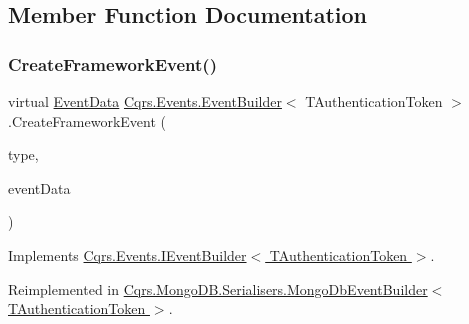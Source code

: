 \subsection{Member Function Documentation}
\mbox{\label{classCqrs_1_1Events_1_1EventBuilder_aa6a794ef27f2795802a4390fd16535f6_aa6a794ef27f2795802a4390fd16535f6}} 
\subsubsection{\texorpdfstring{Create\+Framework\+Event()}{CreateFrameworkEvent()}\hspace{0.1cm}{\footnotesize\ttfamily [1/2]}}
{\footnotesize\ttfamily virtual \hyperlink{classCqrs_1_1Events_1_1EventData}{Event\+Data} \hyperlink{classCqrs_1_1Events_1_1EventBuilder}{Cqrs.\+Events.\+Event\+Builder}$<$ T\+Authentication\+Token $>$.Create\+Framework\+Event (\begin{DoxyParamCaption}\item[{string}]{type,  }\item[{\hyperlink{interfaceCqrs_1_1Events_1_1IEvent}{I\+Event}$<$ T\+Authentication\+Token $>$}]{event\+Data }\end{DoxyParamCaption})\hspace{0.3cm}{\ttfamily [virtual]}}



Implements \hyperlink{interfaceCqrs_1_1Events_1_1IEventBuilder_ac77123302de4e79df9661c13219af4d4_ac77123302de4e79df9661c13219af4d4}{Cqrs.\+Events.\+I\+Event\+Builder$<$ T\+Authentication\+Token $>$}.



Reimplemented in \hyperlink{classCqrs_1_1MongoDB_1_1Serialisers_1_1MongoDbEventBuilder_a06afbb994fd3f679f275dea3d1d60c6e_a06afbb994fd3f679f275dea3d1d60c6e}{Cqrs.\+Mongo\+D\+B.\+Serialisers.\+Mongo\+Db\+Event\+Builder$<$ T\+Authentication\+Token $>$}.

\mbox{\label{classCqrs_1_1Events_1_1EventBuilder_abcc2515f98e4852ab656f1868e7a344c_abcc2515f98e4852ab656f1868e7a344c}} 

